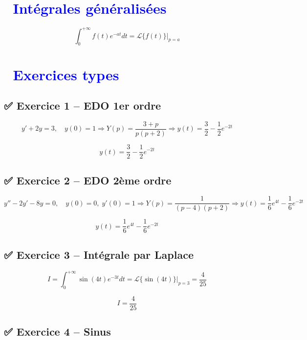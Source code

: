 \documentclass[10pt,a4paper]{article}
\begin{document}
\begin{multicols}{2}
\section*{\textcolor{blue}{🧮 Intégrales généralisées}}

\[
\int_0^{+\infty} f(t)e^{-at} dt = \mathcal{L}\{f(t)\} \Big|_{p = a}
\]

\vspace{0.5em}
\section*{\textcolor{blue}{📘 Exercices types}}

\subsection*{✅ Exercice 1 – EDO 1er ordre}

\[
y' + 2y = 3,\quad y(0) = 1
\Rightarrow Y(p) = \frac{3 + p}{p(p + 2)}
\Rightarrow y(t) = \frac{3}{2} - \frac{1}{2}e^{-2t}
\]

\begin{tcolorbox}[colback=blue!5!white]
\[
\boxed{y(t) = \frac{3}{2} - \frac{1}{2}e^{-2t}}
\]
\end{tcolorbox}

\subsection*{✅ Exercice 2 – EDO 2ème ordre}

\[
y'' - 2y' - 8y = 0,\quad y(0) = 0,\; y'(0) = 1
\Rightarrow Y(p) = \frac{1}{(p - 4)(p + 2)} 
\Rightarrow y(t) = \frac{1}{6}e^{4t} - \frac{1}{6}e^{-2t}
\]

\begin{tcolorbox}[colback=blue!5!white]
\[
\boxed{y(t) = \frac{1}{6}e^{4t} - \frac{1}{6}e^{-2t}}
\]
\end{tcolorbox}

\subsection*{✅ Exercice 3 – Intégrale par Laplace}

\[
I = \int_0^{+\infty} \sin(4t)e^{-3t} dt = \mathcal{L}\{\sin(4t)\}|_{p = 3} = \frac{4}{25}
\]

\begin{tcolorbox}[colback=blue!5!white]
\[
\boxed{I = \frac{4}{25}}
\]
\end{tcolorbox}

\subsection*{✅ Exercice 4 – Sinus}


\end{multicols}
\end{document}
